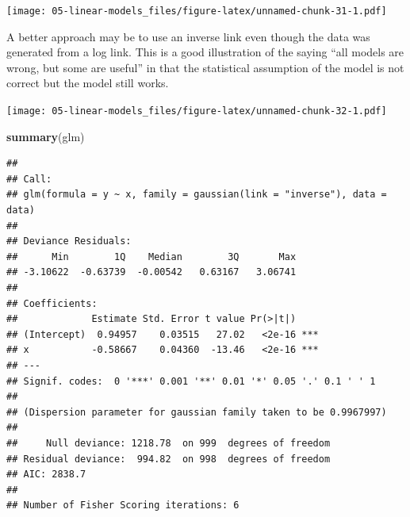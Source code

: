 \documentclass[openany]{book}
\newenvironment{Shaded}{\begin{snugshade}}{\end{snugshade}}
\newcommand{\DataTypeTok}[1]{\textcolor[rgb]{0.13,0.29,0.53}{#1}}
\newcommand{\DecValTok}[1]{\textcolor[rgb]{0.00,0.00,0.81}{#1}}
\newcommand{\FloatTok}[1]{\textcolor[rgb]{0.00,0.00,0.81}{#1}}
\newcommand{\KeywordTok}[1]{\textcolor[rgb]{0.13,0.29,0.53}{\textbf{#1}}}
\newcommand{\NormalTok}[1]{#1}
\newcommand{\OperatorTok}[1]{\textcolor[rgb]{0.81,0.36,0.00}{\textbf{#1}}}
\newcommand{\StringTok}[1]{\textcolor[rgb]{0.31,0.60,0.02}{#1}}
\begin{document}
\texttt{[image: 05-linear-models\_files/figure-latex/unnamed-chunk-31-1.pdf]}

A better approach may be to use an inverse link even though the data was generated from a log link. This is a good illustration of the saying ``all models are wrong, but some are useful'' in that the statistical assumption of the model is not correct but the model still works.

\begin{Shaded}
\end{Shaded}

\texttt{[image: 05-linear-models\_files/figure-latex/unnamed-chunk-32-1.pdf]}

\begin{Shaded}
\begin{Highlighting}[]
\KeywordTok{summary}\NormalTok{(glm)}
\end{Highlighting}
\end{Shaded}

\begin{verbatim}
## 
## Call:
## glm(formula = y ~ x, family = gaussian(link = "inverse"), data = data)
## 
## Deviance Residuals: 
##      Min        1Q    Median        3Q       Max  
## -3.10622  -0.63739  -0.00542   0.63167   3.06741  
## 
## Coefficients:
##             Estimate Std. Error t value Pr(>|t|)    
## (Intercept)  0.94957    0.03515   27.02   <2e-16 ***
## x           -0.58667    0.04360  -13.46   <2e-16 ***
## ---
## Signif. codes:  0 '***' 0.001 '**' 0.01 '*' 0.05 '.' 0.1 ' ' 1
## 
## (Dispersion parameter for gaussian family taken to be 0.9967997)
## 
##     Null deviance: 1218.78  on 999  degrees of freedom
## Residual deviance:  994.82  on 998  degrees of freedom
## AIC: 2838.7
## 
## Number of Fisher Scoring iterations: 6
\end{verbatim}
\end{document}
